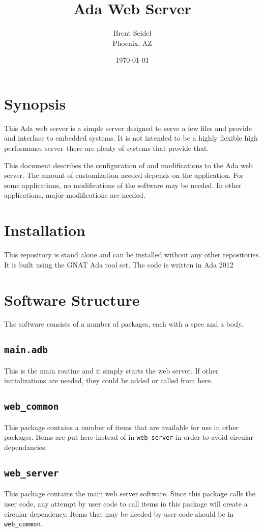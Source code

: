 \documentclass[10pt, openany, draft]{article}
\title{Ada Web Server}
\author{Brent Seidel \\ Phoenix, AZ}
\date{ \today }
\begin{document}
\maketitle
\section{Synopsis}
This Ada web server is a simple server designed to serve a few files and provide and interface to embedded systems.  It is not intended to be a highly flexible high performance server--there are plenty of systems that provide that.

This document describes the configuration of and modifications to the Ada web server.  The amount of customization needed depends on the application.  For some applications, no modifications of the software may be needed.  In other applications, major modifications are needed.

\section{Installation}
This repository is stand alone and can be installed without any other repositories.  It is built using the GNAT Ada tool set.  The code is written in Ada 2012

\section{Software Structure}
The software consists of a number of packages, each with a spec and a body.

\subsection{\texttt{main.adb}}
This is the main routine and it simply starts the web server.  If other initializations are needed, they could be added or called from here.

\subsection{\texttt{web\_common}}
This package contains a number of items that are available for use in other packages.  Items are put here instead of in \texttt{web\_server} in order to avoid circular dependancies.

\subsection{\texttt{web\_server}}
This package contains the main web server software.  Since this package calls the user code, any attempt by user code to call items in this package will create a circular dependency.  Items that may be needed by user code should be in \texttt{web\_common}.
\end{document}

